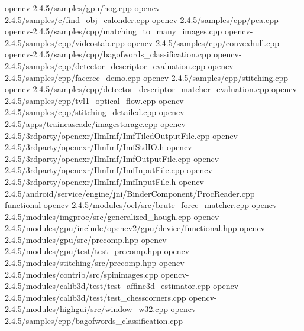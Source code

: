 \documentclass[10pt,a4paper]{article}
\begin{document}
opencv-2.4.5/samples/gpu/hog.cpp \newline
opencv-2.4.5/samples/c/find\_obj\_calonder.cpp \newline
opencv-2.4.5/samples/cpp/pca.cpp \newline
opencv-2.4.5/samples/cpp/matching\_to\_many\_images.cpp \newline
opencv-2.4.5/samples/cpp/videostab.cpp \newline
opencv-2.4.5/samples/cpp/convexhull.cpp \newline
opencv-2.4.5/samples/cpp/bagofwords\_classification.cpp \newline
opencv-2.4.5/samples/cpp/detector\_descriptor\_evaluation.cpp \newline
opencv-2.4.5/samples/cpp/facerec\_demo.cpp \newline
opencv-2.4.5/samples/cpp/stitching.cpp \newline
opencv-2.4.5/samples/cpp/detector\_descriptor\_matcher\_evaluation.cpp \newline
opencv-2.4.5/samples/cpp/tvl1\_optical\_flow.cpp \newline
opencv-2.4.5/samples/cpp/stitching\_detailed.cpp \newline
opencv-2.4.5/apps/traincascade/imagestorage.cpp \newline
opencv-2.4.5/3rdparty/openexr/IlmImf/ImfTiledOutputFile.cpp \newline
opencv-2.4.5/3rdparty/openexr/IlmImf/ImfStdIO.h \newline
opencv-2.4.5/3rdparty/openexr/IlmImf/ImfOutputFile.cpp \newline
opencv-2.4.5/3rdparty/openexr/IlmImf/ImfInputFile.cpp \newline
opencv-2.4.5/3rdparty/openexr/IlmImf/ImfInputFile.h \newline
opencv-2.4.5/android/service/engine/jni/BinderComponent/ProcReader.cpp \\


functional \newline
opencv-2.4.5/modules/ocl/src/brute\_force\_matcher.cpp
opencv-2.4.5/modules/imgproc/src/generalized\_hough.cpp
opencv-2.4.5/modules/gpu/include/opencv2/gpu/device/functional.hpp
opencv-2.4.5/modules/gpu/src/precomp.hpp
opencv-2.4.5/modules/gpu/test/test\_precomp.hpp
opencv-2.4.5/modules/stitching/src/precomp.hpp
opencv-2.4.5/modules/contrib/src/spinimages.cpp
opencv-2.4.5/modules/calib3d/test/test\_affine3d\_estimator.cpp
opencv-2.4.5/modules/calib3d/test/test\_chesscorners.cpp
opencv-2.4.5/modules/highgui/src/window\_w32.cpp
opencv-2.4.5/samples/cpp/bagofwords\_classification.cpp
\end{document}
